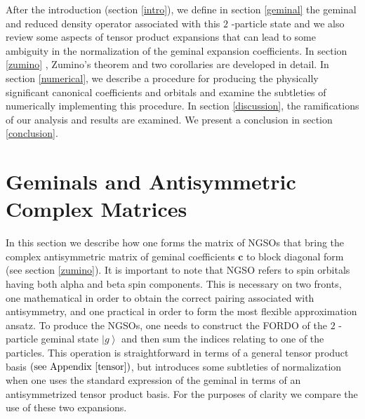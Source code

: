 \documentclass[preprint,aps,showkeys]{revtex4}%
\begin{document}
After the introduction (section \ref{intro}), we define in section
\ref{geminal} the geminal and reduced density operator associated with this
$2$ -particle state and we also review some aspects of tensor product
expansions that can lead to some ambiguity in the normalization of the geminal
expansion coefficients. In section \ref{zumino} , Zumino's theorem and two
corollaries are developed in detail. In section \ref{numerical}, we describe a
procedure for producing the physically significant canonical coefficients and
orbitals and examine the subtleties of numerically implementing this
procedure. In section \ref{discussion}, the ramifications of our analysis and
results are examined. We present a conclusion in section \ref{conclusion}.

\section{Geminals and Antisymmetric Complex Matrices\label{geminal}}

In this section we describe how one forms the matrix of NGSOs that bring the
complex antisymmetric matrix of geminal coefficients $\mathbf{c}$\textbf{ }to
block diagonal form (see section \ref{zumino}). It is important to note that
NGSO refers to spin orbitals having both alpha and beta spin components. This
is necessary on two fronts, one mathematical in order to obtain the correct
pairing associated with antisymmetry, and one practical in order to form the
most flexible approximation ansatz. To produce the NGSOs, one needs to
construct the FORDO of the $2$ -particle geminal state $\left\vert
g\right\rangle $ and then sum the indices relating to one of the
particles.\textbf{ }This operation is straightforward in terms of a general
tensor product basis $\left(  \text{see Appendix \ref{tensor}}\right)  $, but
introduces some subtleties of normalization when one uses the standard
expression of the geminal in terms of an antisymmetrized tensor product basis.
For the purposes of clarity we compare the use of these two expansions.
\end{document}
